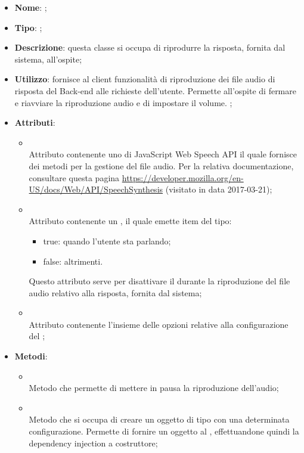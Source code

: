 \begin{itemize}
	\item \textbf{Nome}: ;
	\item \textbf{Tipo}: ;
	\item \textbf{Descrizione}: questa classe si occupa di riprodurre la risposta, fornita dal sistema, all'ospite;
	\item \textbf{Utilizzo}: fornisce al client funzionalità di riproduzione dei file audio di risposta del Back-end alle richieste dell'utente.
	Permette all'ospite di fermare e riavviare la riproduzione audio e di impostare il volume.
	;
	\item \textbf{Attributi}:
	\begin{itemize}
		\item[]  \\
		Attributo contenente uno  di JavaScript Web Speech API il quale fornisce dei metodi per la gestione del file audio.
		Per la relativa documentazione, consultare questa pagina \url{https://developer.mozilla.org/en-US/docs/Web/API/SpeechSynthesis} (visitato in data 2017-03-21);
		\item[]  \\
		Attributo contenente un , il quale emette item del tipo:
		\begin{itemize}
			\item true: quando l'utente sta parlando;
			\item false: altrimenti.
		\end{itemize}
		Questo attributo serve per disattivare il  durante la riproduzione del file audio relativo alla risposta, fornita dal sistema;
		\item[]  \\
		Attributo contenente l'insieme delle opzioni relative alla configurazione del ;
	\end{itemize}
	\item \textbf{Metodi}:
	\begin{itemize}
		\item[]  \\		Metodo che permette di mettere in pausa la riproduzione dell'audio;\\
		\item[]  \\		Metodo che si occupa di creare un oggetto di tipo  con una determinata configurazione. Permette di fornire un oggetto  al , effettuandone quindi la dependency injection a costruttore;\\

\end{itemize}
\end{itemize}
